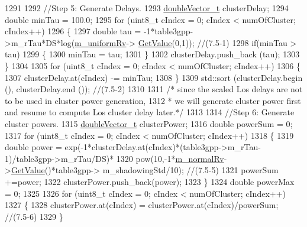 \begin{DoxyCode}
1291 
1292         \textcolor{comment}{//Step 5: Generate Delays.}
1293         \hyperlink{namespacens3_aa6f1edf6566ca6afec613bc6e40240ea}{doubleVector\_t} clusterDelay;
1294         \textcolor{keywordtype}{double} minTau = 100.0;
1295         \textcolor{keywordflow}{for} (uint8\_t cIndex = 0; cIndex < numOfCluster; cIndex++)
1296         \{
1297                 \textcolor{keywordtype}{double} tau = -1*table3gpp->m\_rTau*DS*log(\hyperlink{classns3_1_1MmWave3gppChannel_ac6493e4d80b717378e74a63d418f8c6f}{m\_uniformRv}->
      \hyperlink{classns3_1_1UniformRandomVariable_a03822d8c86ac51e9aa83bbc73041386b}{GetValue}(0,1)); \textcolor{comment}{//(7.5-1)}
1298                 \textcolor{keywordflow}{if}(minTau > tau)
1299                 \{
1300                         minTau = tau;
1301                 \}
1302                 clusterDelay.push\_back (tau);
1303         \}
1304 
1305         \textcolor{keywordflow}{for} (uint8\_t cIndex = 0; cIndex < numOfCluster; cIndex++)
1306         \{
1307                 clusterDelay.at(cIndex) -= minTau;
1308         \}
1309         std::sort (clusterDelay.begin (), clusterDelay.end ()); \textcolor{comment}{//(7.5-2)}
1310 
1311         \textcolor{comment}{/* since the scaled Los delays are not to be used in cluster power generation,}
1312 \textcolor{comment}{         * we will generate cluster power first and resume to compute Los cluster delay later.*/}
1313 
1314         \textcolor{comment}{//Step 6: Generate cluster powers.}
1315         \hyperlink{namespacens3_aa6f1edf6566ca6afec613bc6e40240ea}{doubleVector\_t} clusterPower;
1316         \textcolor{keywordtype}{double} powerSum = 0;
1317         \textcolor{keywordflow}{for} (uint8\_t cIndex = 0; cIndex < numOfCluster; cIndex++)
1318         \{
1319                 \textcolor{keywordtype}{double} power = exp(-1*clusterDelay.at(cIndex)*(table3gpp->m\_rTau-1)/table3gpp->m\_rTau/DS)*
1320                                 pow(10,-1*\hyperlink{classns3_1_1MmWave3gppChannel_ac2e02ebacc72ed96518d785f2dc87c57}{m\_normalRv}->\hyperlink{classns3_1_1NormalRandomVariable_a0134d131477bc439cc6ff7cbe84b03a9}{GetValue}()*table3gpp->
      m\_shadowingStd/10); \textcolor{comment}{//(7.5-5)}
1321                 powerSum +=power;
1322                 clusterPower.push\_back(power);
1323         \}
1324         \textcolor{keywordtype}{double} powerMax = 0;
1325 
1326         \textcolor{keywordflow}{for} (uint8\_t cIndex = 0; cIndex < numOfCluster; cIndex++)
1327         \{
1328                 clusterPower.at(cIndex) = clusterPower.at(cIndex)/powerSum; \textcolor{comment}{//(7.5-6)}
1329         \}

\end{DoxyCode}
